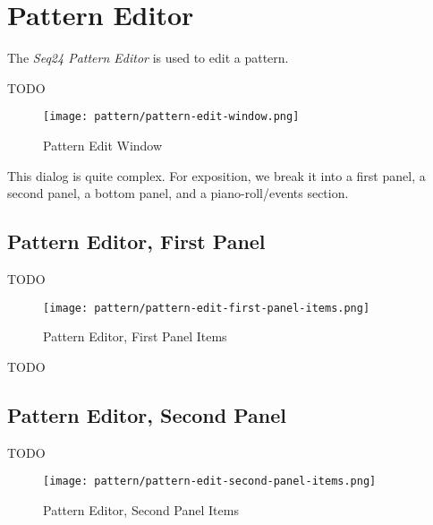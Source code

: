 %
%
%

\section{Pattern Editor}
\label{sec:seq24_pattern_editor}

   The \textsl{Seq24 Pattern Editor} is used to edit a pattern.

   TODO

\begin{figure}[H]
   \centering 
   \texttt{[image: pattern/pattern-edit-window.png]}
   \caption{Pattern Edit Window}
   \label{fig:pattern_edit_window}
\end{figure}

   This dialog is quite complex.
   For exposition, we break it into a first panel, a second panel, a
   bottom panel, and a piano-roll/events section.

\subsection{Pattern Editor, First Panel}
\label{subsec:seq24_pattern_editor_first}

   TODO

\begin{figure}[H]
   \centering 
   \texttt{[image: pattern/pattern-edit-first-panel-items.png]}
   \caption{Pattern Editor, First Panel Items}
   \label{fig:pattern_editor_first_panel_items}
\end{figure}

   TODO

\subsection{Pattern Editor, Second Panel}
\label{subsec:seq24_pattern_editor_second}

   TODO

\begin{figure}[H]
   \centering 
   \texttt{[image: pattern/pattern-edit-second-panel-items.png]}
   \caption{Pattern Editor, Second Panel Items}
   \label{fig:pattern_editor_main_panel_items}
\end{figure}

